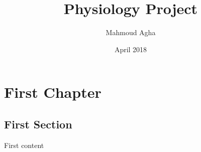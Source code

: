 \documentclass[a4papear]{report}
\title{Physiology Project}
\author{Mahmoud Agha}
\date{April 2018}
\begin{document}
	\maketitle
	\chapter{First Chapter}
	\section{First Section}
	First content
\end{document}
